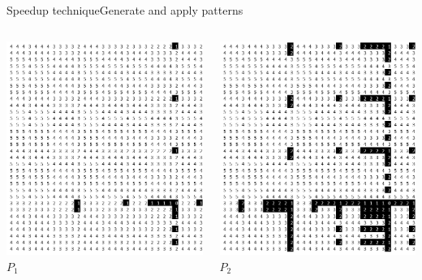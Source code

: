 \documentclass[pdf,xcolor={dvipsnames}]{beamer}
\begin{document}
\begin{frame}{Speedup technique}{Generate and apply patterns}
\begin{enumerate}
\begin{columns}
			\begin{column}{0.12\textwidth}\includegraphics[width=\textwidth]{img/1}\\ \centering $P_1$ \end{column}
			\begin{column}{0.12\textwidth}\includegraphics[width=\textwidth]{img/2}\\ \centering $P_2$ \end{column}

\end{columns}
\end{enumerate}
\end{frame}
\end{document}
